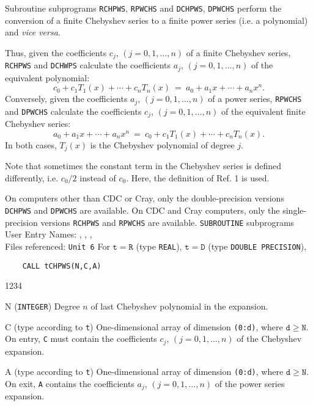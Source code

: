                            
            
\Submitter{}         
Subroutine subprograms {\tt RCHPWS}, {\tt RPWCHS} and
{\tt DCHPWS}, {\tt DPWCHS} perform the conversion of a finite
Chebyshev series to a finite power series (i.e. a polynomial) and
{\it vice versa}.
\par
Thus, given the coefficients $c_j$,
$(j=0,1,\ldots,n)$ of a finite Chebyshev series,
{\tt RCHPWS} and {\tt DCHWPS} calculate the coefficients
$a_j$, $(j=0,1,\ldots,n)$ of the equivalent polynomial:
$$ c_0+c_1T_1(x)+\cdots+c_nT_n(x) \ = \ a_0+a_1x+\cdots+a_nx^n. $$
Conversely, given the coefficients $a_j$,
$(j=0,1,\ldots,n)$ of a power series,
{\tt RPWCHS} and {\tt DPWCHS} calculate the coefficients
$c_j$, $(j=0,1,\ldots,n)$ of the equivalent finite Chebyshev series:
$$ a_0+a_1x+\cdots+a_nx^n \ = \ c_0+c_1T_1(x)+\cdots+c_nT_n(x). $$
In both cases, $T_j(x)$ is the Chebyshev polynomial of degree $j$.
\par
Note that sometimes the constant term in the Chebyshev series is
defined differently, i.e. $c_0/2$ instead of $c_0$.
Here, the definition of Ref. 1 is used.
\par
On computers other than CDC or Cray, only the double-precision versions
{\tt DCHPWS} and {\tt DPWCHS} are available.
On CDC and Cray computers, only the single-precision versions
{\tt RCHPWS} and {\tt RPWCHS} are available.
\Structure
{\tt SUBROUTINE} subprograms \\
User Entry Names: , ,
                  ,  \\
Files referenced: {\tt Unit 6}
\Usage
For $\mathtt{t=R}$ (type {\tt REAL}), $\mathtt{t=D}$ (type
{\tt DOUBLE PRECISION}),
\begin{verbatim}
    CALL tCHPWS(N,C,A)
\end{verbatim}
\begin{DLtt}{1234}
\item[N] ({\tt INTEGER}) Degree $n$ of last Chebyshev polynomial
in the expansion.
\item[C] (type according to {\tt t}) One-dimensional array of dimension
{\tt (0:d)}, where $\mathtt{d \ge N}$. On entry, {\tt C} must contain
the coefficients $c_j$, $(j=0,1,\ldots,n)$ of the Chebyshev expansion.
\item[A] (type according to {\tt t}) One-dimensional array of dimension
{\tt (0:d)}, where $\mathtt{d \ge N}$. On exit, {\tt A} contains the
coefficients $a_j$, $(j=0,1,\ldots,n)$ of the power series expansion.
\end{DLtt}
